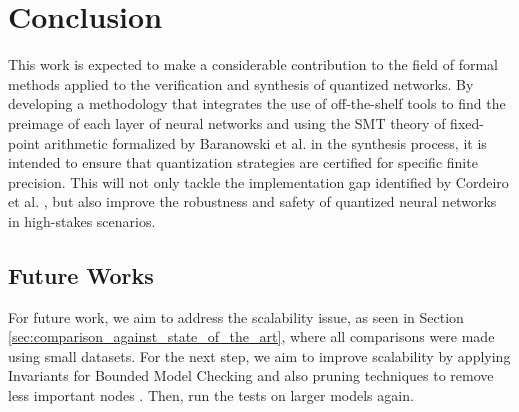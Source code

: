 \chapter{Conclusion} \label{chap:conclusao}

This work is expected to make a considerable contribution to the field of formal methods applied to the verification and synthesis of quantized networks. By developing a methodology that integrates the use of off-the-shelf tools to find the preimage of each layer of neural networks and using the SMT theory of fixed-point arithmetic formalized by Baranowski et al. \cite{baranowski2020smt} in the synthesis process, it is intended to ensure that quantization strategies are certified for specific finite precision. This will not only tackle the implementation gap identified by Cordeiro et al. \cite{cordeiro2025neuralnetworkverificationprogramming}, but also improve the robustness and safety of quantized neural networks in high-stakes scenarios.


\section{Future Works}

For future work, we aim to address the scalability issue, as seen in Section \ref{sec:comparison_against_state_of_the_art}, where all comparisons were made using small datasets. For the next step, we aim to improve scalability by applying Invariants for Bounded Model Checking \cite{10.1145/3691620.3695512} and also pruning techniques to remove less important nodes \cite{dantasComprehensiveReviewModel2024}. Then, run the tests on larger models again.


